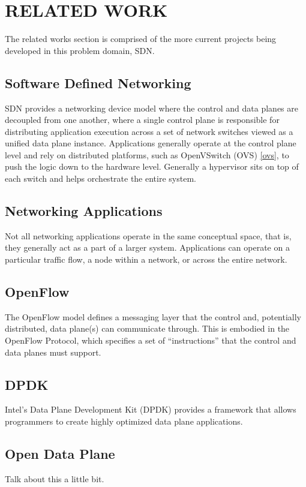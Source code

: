 \chapter{RELATED WORK}
\label{related}
The related works section is comprised of the more current projects being
developed in this problem domain, SDN.

\section{Software Defined Networking}
\label{related:sdn}
SDN provides a networking device model where the control and data planes are
decoupled from one another, where a single control plane is responsible for
distributing application execution across a set of network switches viewed as
a unified data plane instance. Applications generally operate at the control
plane level and rely on distributed platforms, such as OpenVSwitch (OVS)
\ref{ovs}, to push the logic down to the hardware level. Generally a hypervisor
sits on top of each switch and helps orchestrate the entire system.


\section{Networking Applications}
\label{related:apps}
Not all networking applications operate in the same conceptual space, that is,
they generally act as a part of a larger system. Applications can operate on a
particular traffic flow, a node within a network, or across the entire network.

\section{OpenFlow}
\label{related:of}
The OpenFlow \cite{openflow} model defines a messaging layer that the control and, potentially
distributed, data plane(s) can communicate through. This is embodied in the
OpenFlow Protocol, which specifies a set of ``instructions'' that the control
and data planes must support.

\section{DPDK}
\label{related:dpdk}
Intel's Data Plane Development Kit (DPDK) \cite{dpdk} provides a framework that
allows programmers to create highly optimized data plane applications.

\section{Open Data Plane}
\label{related:odp}
Talk about this a little bit.

